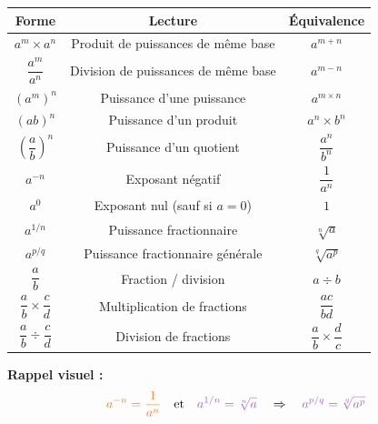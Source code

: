 \documentclass[11pt,a4paper]{article}
\newcommand{\rulebox}[3]{
\begin{tcolorbox}[colback=#1!10!white,colframe=#1!60!black,title=\textbf{#2}]
#3
\end{tcolorbox}
}
\begin{document}
\rulebox{black}{\Large Synthèse des équivalences entre puissances, fractions et racines}{
\begin{center}
\renewcommand{\arraystretch}{1.6}
\setlength{\tabcolsep}{10pt}

\begin{tabular}{|c|c|c|}
\hline
\rowcolor{gray!20}
\textbf{Forme} & \textbf{Lecture} & \textbf{Équivalence}\\
\hline
\textcolor{poworange}{$a^m \times a^n$} &
Produit de puissances de même base &
\textcolor{poworange}{$a^{m+n}$}\\
\hline
\textcolor{poworange}{$\dfrac{a^m}{a^n}$} &
Division de puissances de même base &
\textcolor{poworange}{$a^{m-n}$}\\
\hline
\textcolor{poworange}{$(a^m)^n$} &
Puissance d’une puissance &
\textcolor{poworange}{$a^{m\times n}$}\\
\hline
\textcolor{poworange}{$(ab)^n$} &
Puissance d’un produit &
\textcolor{poworange}{$a^n \times b^n$}\\
\hline
\textcolor{poworange}{$\left(\dfrac{a}{b}\right)^n$} &
Puissance d’un quotient &
\textcolor{poworange}{$\dfrac{a^n}{b^n}$}\\
\hline
\textcolor{poworange}{$a^{-n}$} &
Exposant négatif &
\textcolor{poworange}{$\dfrac{1}{a^n}$}\\
\hline
\textcolor{poworange}{$a^0$} &
Exposant nul (sauf si $a=0$) &
\textcolor{poworange}{$1$}\\
\hline
\textcolor{rootpurple}{$a^{1/n}$} &
Puissance fractionnaire &
\textcolor{rootpurple}{$\sqrt[n]{a}$}\\
\hline
\textcolor{rootpurple}{$a^{p/q}$} &
Puissance fractionnaire générale &
\textcolor{rootpurple}{$\sqrt[q]{a^p}$}\\
\hline
\textcolor{fracgreen}{$\dfrac{a}{b}$} &
Fraction / division &
\textcolor{fracgreen}{$a \div b$}\\
\hline
\textcolor{fracgreen}{$\dfrac{a}{b} \times \dfrac{c}{d}$} &
Multiplication de fractions &
\textcolor{fracgreen}{$\dfrac{ac}{bd}$}\\
\hline
\textcolor{fracgreen}{$\dfrac{a}{b} \div \dfrac{c}{d}$} &
Division de fractions &
\textcolor{fracgreen}{$\dfrac{a}{b} \times \dfrac{d}{c}$}\\
\hline
\end{tabular}
\end{center}

\vspace{0.4cm}
\textbf{Rappel visuel :}
\[
\textcolor{poworange}{a^{-n} = \dfrac{1}{a^n}} \quad\text{et}\quad
\textcolor{rootpurple}{a^{1/n} = \sqrt[n]{a}} \quad\Rightarrow\quad
\textcolor{rootpurple}{a^{p/q} = \sqrt[q]{a^p}}
\]
}
\end{document}
